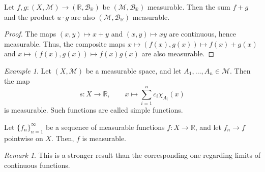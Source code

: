 \documentclass[11pt]{article}
\newcommand{\R}{\mathbb{R}}
\newcommand{\M}{\mathcal{M}}
\theoremstyle{definition}
\theoremstyle{remark}
\newtheorem*{remark}{Remark}
\newtheorem*{example}{Example}
\numberwithin{equation}{section}
\begin{document}
    \begin{corollary}
        Let $f, g\colon (X, \M) \to (\R, \mathcal{B}_\R)$ be $(\M, \mathcal{B}_\R)$
        measurable. Then the sum $f + g$ and the product $u\cdot g$ are also $(\M,
        \mathcal{B}_\R)$ measurable.
    \end{corollary}
    \begin{proof}
        The maps $(x, y) \mapsto x + y$ and $(x, y) \mapsto xy$ are continuous, hence
        measurable. Thus, the composite maps $x \mapsto (f(x), g(x)) \mapsto f(x) +
        g(x)$ and $x \mapsto (f(x), g(x)) \mapsto f(x)g(x)$ are also measurable.
    \end{proof}

    \begin{example}
        Let $(X, \M)$ be a measurable space, and let $A_1, \dots, A_n \in \M$. Then
        the map \[
            s\colon X \to \R, \qquad x \mapsto \sum_{i = 1}^n c_i \chi_{A_i}(x)
        \] is measurable. Such functions are called simple functions.
    \end{example}

    \begin{theorem}
        Let $\{f_n\}_{n = 1}^\infty$ be a sequence of measurable functions $f\colon X
        \to \R$, and let $f_n \to f$ pointwise on $X$. Then, $f$ is measurable.
        \begin{remark}
            This is a stronger result than the corresponding one regarding limits of
            continuous functions.
        \end{remark}
    \end{theorem}
    
\end{document}
